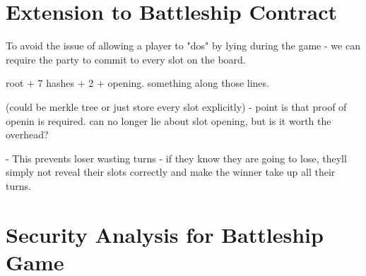 \documentclass{llncs}
\begin{document}
\section{Extension to Battleship Contract}

To avoid the issue of allowing a player to "dos" by lying during the game - we can require the party to commit to every slot on the board. 

root + 7 hashes + 2 + opening. something along those lines. 

(could be merkle tree or just store every slot explicitly) - point is that proof of openin is required. can no longer lie about slot opening, but is it worth the overhead? 

- This prevents loser wasting turns - if they know they are going to lose, theyll simply not reveal their slots correctly and make the winner take up all their turns. 

\section{Security Analysis for Battleship Game}
\end{document}
